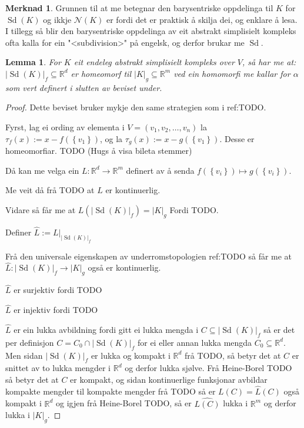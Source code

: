 \documentclass[a4paper, titlepage, 12pt, norsk]{article}
\theoremstyle{plain}
\newtheorem{lemma}[theorem]{Lemma}
\theoremstyle{definition}
\newtheorem{remark}[theorem]{Merknad}
\newcommand{\Rb}{\mathbb{R}}
\newcommand{\Nc}{\mathcal{N}}
\newcommand{\intersect}{ \mathop{\cap}\limits } %
\newcommand{\gr}[1]{ \lvert #1 \rvert } %
\newcommand{\set}[1]{ \left \{ #1 \right \} } %
\DeclareMathOperator{\Sd}{Sd}
\begin{document}
\begin{theroem}
\begin{remark}
	Grunnen til at me betegnar den barysentriske oppdelinga til \( K \) for \( \Sd(K) \) og ikkje \( \Nc(K) \) er fordi det er praktisk å skilja dei, og enklare å lesa. I tillegg så blir den barysentriske oppdelinga av eit abstrakt simplisielt kompleks ofta kalla for ein "<subdivision>" på engelsk, og derfor brukar me \( \Sd \).
\end{remark}

\begin{lemma}
	For \( K \) eit endeleg abstrakt simplisielt kompleks over \( V \), så har me at:
	\( \gr{\Sd(K)}_f \subseteq \Rb^d \) er homeomorf til \( \gr{K}_g \subseteq \Rb^m \) ved ein homomorfi me kallar for \( \alpha \) som vert definert i slutten av beviset under.
\end{lemma}

\begin{proof} %
	Dette beviset bruker mykje den same strategien som i ref:TODO.

	Fyrst, lag ei ording av elementa i \( V = (v_1, v_2, \dots, v_n) \) la \( \tau_f(x) := x-f(\set{v_1}) \), og la \( \tau_g(x) := x-g(\set{v_1}) \). Desse er homeomorfiar. TODO (Hugs å visa bileta stemmer)

	Då kan me velga ein \( L: \Rb^d \to \Rb^m \) definert av å senda \( f(\set{v_i}) \mapsto g(\set{v_i}) \). 

	Me veit då frå TODO at \( L \) er kontinuerlig. 

	Vidare så får me at \( L(\gr{\Sd(K)}_f) = \gr{K}_g \) Fordi TODO. 

	Definer \( \hat{L} := L|_{\gr{\Sd(K)}_f} \)

	Frå den universale eigenskapen av underromstopologien ref:TODO så får me at \( \hat{L}: \gr{\Sd(K)}_f \to \gr{K}_g \) også er kontinuerlig.

	\( \hat{L} \) er surjektiv fordi TODO

	\( \hat{L} \) er injektiv fordi TODO

	\( \hat{L} \) er ein lukka avbildning fordi gitt ei lukka mengda i \( C \subseteq \gr{\Sd(K)}_f \) så er det per definisjon \( C = C_0 \intersect \gr{\Sd(K)}_f \) for ei eller annan lukka mengda \( C_0 \subseteq \Rb^d \). Men sidan \( \gr{\Sd(K)}_f \) er lukka og kompakt i \( \Rb^d \) frå TODO, så betyr det at \( C \) er snittet av to lukka mengder i \( \Rb^d \) og derfor lukka sjølve. Frå Heine-Borel TODO så betyr det at \( C \) er kompakt, og sidan kontinuerlige funksjonar avbildar kompakte mengder til kompakte mengder frå TODO så er \( L(C)=\hat{L}(C) \) også kompakt i \( \Rb^d \) og igjen frå Heine-Borel TODO, så er \( \hat{L(C)} \) lukka i \( \Rb^m \) og derfor lukka i \( \gr{K}_g \).


\end{proof}
\end{theroem}
\end{document}
